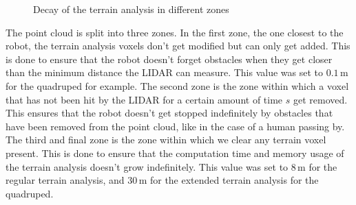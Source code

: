 \documentclass[12pt]{article}
\begin{document}
        \begin{figure}[H]
            \centering
            \caption{Decay of the terrain analysis in different zones}
            \label{fig:decay}
        \end{figure}

        The point cloud is split into three zones. In the first zone, the one closest to the robot, the terrain analysis voxels don't get modified but can only get added. This is done to ensure that the robot doesn't forget obstacles when they get closer than the minimum distance the LIDAR can measure. This value was set to $0.1\,\text{m}$ for the quadruped for example.
        The second zone is the zone within which a voxel that has not been hit by the LIDAR for a certain amount of time $s$ get removed. This ensures that the robot doesn't get stopped indefinitely by obstacles that have been removed from the point cloud, like in the case of a human passing by. The third and final zone is the zone within which we clear any terrain voxel present. This is done to ensure that the computation time and memory usage of the terrain analysis doesn't grow indefinitely. This value was set to $8\,\text{m}$ for the regular terrain analysis, and $30\,\text{m}$ for the extended terrain analysis for the quadruped.
        
\end{document}
